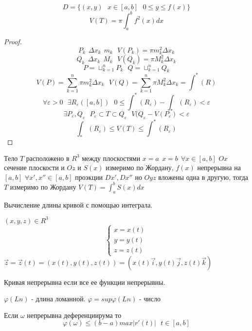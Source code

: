 \begin{theorem}
  $$
  D = \{ (x,y) ~~~ x \in [a,b] ~~~
  0 \le y \le f(x) \}
  $$
  $$
  V(T) = \pi \int_a^b f^2(x) dx
  $$
\end{theorem}

\begin{proof}
  $$
  P_k ~~ \Delta x_k ~~ m_k ~~~
  V(P_k) = \pi m_k^2 \Delta x_k
  $$
  $$
  Q_k ~~ \Delta x_k ~~ M_k ~~~
  V(Q_k) = \pi M_k^2 \Delta x_k
  $$
  $$
  P = \sqcup_{k=1}^n P_k ~~~
  Q = \sqcup_{k=1}^n Q_k
  $$
  $$
  V(P) = \sum_{k=1}^n \pi m_k^2 \Delta x_k ~~~
  V(Q) = \sum_{k=1}^n \pi M_k^2 \Delta x_k = \int^* (R)
  $$
  $$
  \forall \varepsilon > 0 ~~~
  \exists R_{\varepsilon} ([a,b]) ~~~
  0 \le \int^* (R_{\varepsilon}) - \int_* (R_{\varepsilon}) < \varepsilon
  $$
  $$
  \exists P_{\varepsilon}, Q_{\varepsilon} ~~~
  P_{\varepsilon} \subset T \subset Q_{\varepsilon} ~~~
  V(Q_{\varepsilon} - V(P_{\varepsilon}) < \varepsilon
  $$
  $$
  \int_* (R_{\varepsilon}) \le V(T) \le \int^* (R_{\varepsilon})
  $$
\end{proof}

\begin{theorem}
  Тело $T$ расположено в $R^3$ между плоскостями $x = a ~~ x = b ~~
  \forall x \in [a,b]$ $Ox$ сечение плоскости и $Oz$ и $S(x)$ измеримо по
  Жордану, $f(x)$ непрерывна на $[a,b]$ $\forall x', x'' \in [a,b]$ проэкции
  $Dx', Dx''$ но $Oyz$ вложены одна в другую, тогда $T$ измеримо по Жордану
  $V(T) = \int_a^b S(x) dx$
\end{theorem}

\begin{title}[\Large]
  Вычисление длины кривой с помощью интеграла.
\end{title}

\begin{defin}[кривой]
  $(x,y,z) \in R^3$
  $$
    \left\{
      \begin{array}{l}
        x = x(t) \\
        y = y(t) \\
        z = z(t)
      \end{array}
    \right.
  $$
  $
  \vec z = \vec z (t) = ( x(t), y(t) , z(t) ) =
  ( x(t)\vec i, y(t)\vec j , z(t)\vec k )
  $
\end{defin}

Кривая непрерывна если все ее функции непрерывны.

$\varphi (Ln)$ - длина ломанной. $\varphi = sup \varphi (Ln)$ - число

\begin{theorem}
  Если $\omega$ непрерывна деференциирума то
  $$
  \varphi (\omega) \le (b-a) max |r'(t)| ~~~ t \in [a,b]
  $$
\end{theorem}

